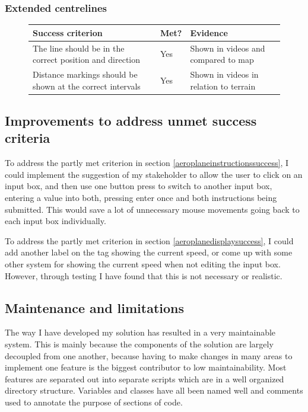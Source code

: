 \documentclass{article}
\begin{document}
\subsubsection{Extended centrelines}
\begin{figure}[H]
\centering
\begin{tabular}{| p{} | p{} | p{} |}
\hline
\textbf{Success criterion} & \textbf{Met?} & \textbf{Evidence} \\
\hline
The line should be in the correct position and direction & Yes & Shown in videos and compared to map \\
\hline
Distance markings should be shown at the correct intervals & Yes & Shown in videos in relation to terrain \\
\hline
\end{tabular}
\end{figure}


\subsection{Improvements to address unmet success criteria}
To address the partly met criterion in section \ref{aeroplaneinstructionssuccess}, I could implement the suggestion of my stakeholder to allow the user to click on an input box, and then use one button press to switch to another input box, entering a value into both, pressing enter once and both instructions being submitted.
This would save a lot of unnecessary mouse movements going back to each input box individually.

To address the partly met criterion in section \ref{aeroplanedisplaysuccess}, I could add another label on the tag showing the current speed, or come up with some other system for showing the current speed when not editing the input box.
However, through testing I have found that this is not necessary or realistic.


\subsection{Maintenance and limitations}
The way I have developed my solution has resulted in a very maintainable system.
This is mainly because the components of the solution are largely decoupled from one another, because having to make changes in many areas to implement one feature is the biggest contributor to low maintainability.
Most features are separated out into separate scripts which are in a well organized directory structure.
Variables and classes have all been named well and comments used to annotate the purpose of sections of code.
\end{document}
